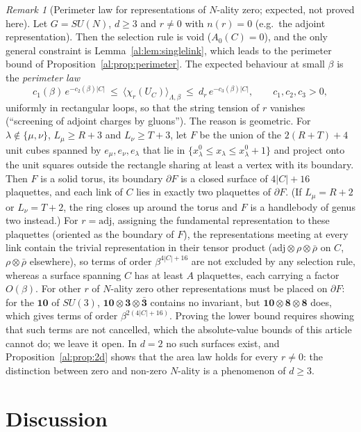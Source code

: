 \documentclass[11pt,a4paper]{article}
\theoremstyle{definition}
\theoremstyle{remark}
\newtheorem{remark}[theorem]{Remark}
\begin{document}
\begin{remark}[Perimeter law for representations of $N$-ality zero; expected, not proved here]\label{al:rem:perimeterlaw}
Let $G=SU(N)$, $d\ge3$ and $r\neq0$ with $n(r)=0$ (e.g.\ the adjoint representation). Then the selection rule is void
($A_0(C)=0$), and the only general constraint is Lemma~\ref{al:lem:singlelink}, which leads to the perimeter bound of
Proposition~\ref{al:prop:perimeter}. The expected behaviour at small $\beta$ is the \emph{perimeter law}
\[
c_1(\beta)\,e^{-c_2(\beta)|C|}\ \le\ \langle\chi_r(U_C)\rangle_{\Lambda,\beta}\ \le\ d_r\,e^{-c_3(\beta)|C|},
\qquad c_1,c_2,c_3>0,
\]
uniformly in rectangular loops, so that the string tension of $r$ vanishes (``screening of adjoint charges by gluons'').
The reason is geometric. For $\lambda\notin\{\mu,\nu\}$, $L_\mu\ge R+3$ and $L_\nu\ge T+3$, let $F$ be the union of the $2(R+T)+4$ unit cubes spanned by
$e_\mu,e_\nu,e_\lambda$ that lie in $\{x^0_\lambda\le x_\lambda\le x^0_\lambda+1\}$ and project onto the unit squares
outside the rectangle sharing at least a vertex with its boundary. Then $F$ is a solid torus, its boundary $\partial F$ is
a closed surface of $4|C|+16$ plaquettes, and each link of $C$ lies in exactly two plaquettes of $\partial F$. (If $L_\mu=R+2$ or
$L_\nu=T+2$, the ring closes up around the torus and $F$ is a handlebody of genus two instead.) For $r=\mathrm{adj}$, assigning the
fundamental representation to these plaquettes (oriented as the boundary of $F$), the representations meeting at every
link contain the trivial representation in their tensor product ($\mathrm{adj}\otimes\rho\otimes\bar\rho$ on $C$,
$\rho\otimes\bar\rho$ elsewhere), so terms of order $\beta^{4|C|+16}$ are not excluded by any selection rule, whereas a surface
spanning $C$ has at least $A$ plaquettes, each carrying a factor $O(\beta)$. For other $r$ of $N$-ality zero other representations
must be placed on $\partial F$: for the $\mathbf{10}$ of $SU(3)$, $\mathbf{10}\otimes\mathbf3\otimes\bar{\mathbf3}$ contains no invariant,
but $\mathbf{10}\otimes\mathbf8\otimes\mathbf8$ does, which gives terms of order $\beta^{2(4|C|+16)}$. Proving the lower bound requires showing that such terms are not
cancelled, which the absolute-value bounds of this article cannot do; we leave it open. In $d=2$ no such surfaces exist,
and Proposition~\ref{al:prop:2d} shows that the area law holds for every $r\neq0$: the distinction between zero and
non-zero $N$-ality is a phenomenon of $d\ge3$.
\end{remark}

\section{Discussion}\label{al:sec:discussion}
\end{document}
